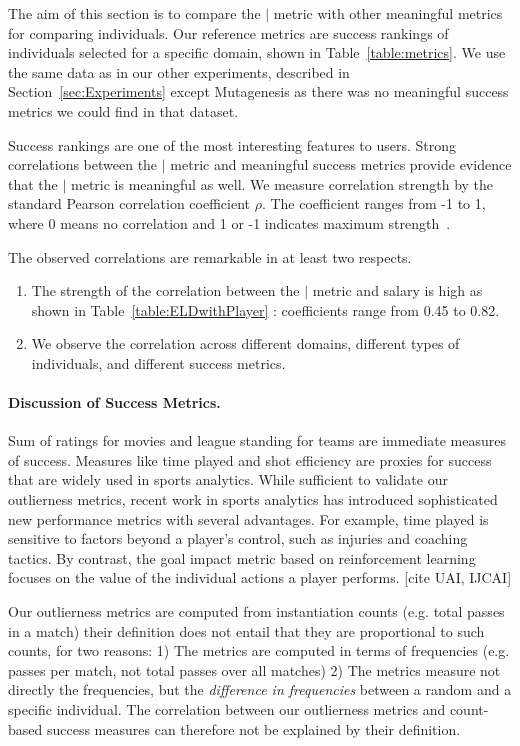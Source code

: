 {The aim of this section is to compare the $\mid$ metric with other meaningful metrics for comparing individuals. Our reference metrics are success rankings of individuals selected for a specific domain, shown in Table~\ref{table:metrics}. We use the same data as in our other experiments, described in Section~\ref{sec:Experiments} except Mutagenesis as there was no meaningful success metrics we could find in that dataset. 

Success rankings are one of the most interesting features to users. Strong correlations between the $\mid$ metric and meaningful success metrics provide evidence that the $\mid$ metric is meaningful as well. We measure correlation strength by the standard Pearson correlation coefficient $\rho$. The coefficient ranges from -1 to 1, where 0 means no correlation and 1 or -1 indicates maximum strength~\citep{Fisher1921}.

The observed correlations are remarkable in at least two respects. 
\begin{enumerate}
\item The strength of the correlation between the $\mid$ metric and salary is high as shown in Table~\ref{table:ELDwithPlayer} : coefficients range from 0.45 to 0.82. 
\item We observe the correlation across different domains, different types of individuals, and different success metrics. 
\end{enumerate}

\paragraph{Discussion of Success Metrics.}
Sum of ratings for movies and league standing for teams are immediate measures of success. Measures like time played and shot efficiency are proxies for success that are widely used in sports analytics. While sufficient to validate our outlierness metrics, recent work in sports analytics has introduced sophisticated new performance metrics with several advantages. For example, time played is sensitive to factors beyond a player's control, such as injuries and coaching tactics.  By contrast, the goal impact metric based on reinforcement learning focuses on the value of the individual actions a player performs. [cite UAI, IJCAI]

Our outlierness metrics are computed from instantiation counts (e.g. total passes in a match) their definition does not entail that they are proportional to such counts, for two reasons: 
1) The metrics are computed in terms of frequencies (e.g. passes per match, not total passes over all matches) 2) The metrics measure not directly the frequencies, but the {\em difference in frequencies} between a random and a specific individual.  The correlation between our outlierness metrics and count-based success measures can therefore not be explained by their definition.



}
